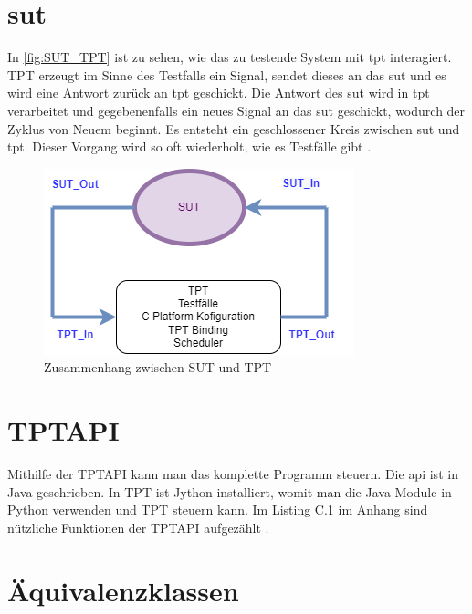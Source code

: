 \section*{\ac{sut}}
In \autoref{fig:SUT_TPT} ist zu sehen, wie das zu testende System mit \ac{tpt} interagiert.
TPT erzeugt im Sinne des Testfalls ein Signal, sendet dieses an das \ac{sut} und
es wird eine Antwort zurück an \ac{tpt} geschickt.
Die Antwort des \ac{sut} wird in \ac{tpt} verarbeitet und gegebenenfalls ein neues Signal an das \ac{sut} geschickt,
wodurch der Zyklus von Neuem beginnt. Es entsteht ein geschlossener Kreis zwischen \ac{sut} und \ac{tpt}.
Dieser Vorgang wird so oft wiederholt, wie es Testfälle gibt \parencite[]{tptsut}.%
\begin{figure}[h]
\centering
\includegraphics[scale=0.9,]{Bilder/Quicktest/SUT_TPT.drawio.png}
\caption{Zusammenhang zwischen SUT und TPT \parencite{tptsut}}\label{fig:SUT_TPT}
\end{figure}

\section*{TPTAPI}
Mithilfe der TPTAPI kann man das komplette Programm steuern. Die \ac{api} ist in Java geschrieben.
In TPT ist Jython installiert, womit man die Java Module in Python verwenden und TPT steuern kann.
Im Listing C.1 im Anhang sind nützliche Funktionen der TPTAPI aufgezählt \parencite[S. 64 f.]{userguide}.

\section*{Äquivalenzklassen}
	